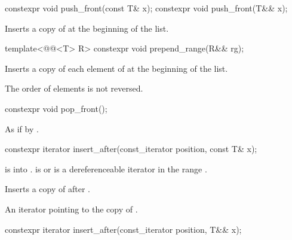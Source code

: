 %
\begin{itemdecl}
constexpr void push_front(const T& x);
constexpr void push_front(T&& x);
\end{itemdecl}

\begin{itemdescr}
\pnum
\effects
Inserts a copy of  at the beginning of the list.
\end{itemdescr}

%
\begin{itemdecl}
template<@@<T> R>
  constexpr void prepend_range(R&& rg);
\end{itemdecl}

\begin{itemdescr}
\pnum
\effects
Inserts a copy of each element of  at the beginning of the list.
\begin{note}
The order of elements is not reversed.
\end{note}
\end{itemdescr}

%
\begin{itemdecl}
constexpr void pop_front();
\end{itemdecl}

\begin{itemdescr}
\pnum
\effects
As if by .
\end{itemdescr}

%
\begin{itemdecl}
constexpr iterator insert_after(const_iterator position, const T& x);
\end{itemdecl}

\begin{itemdescr}
\pnum
\expects
{} is  into .
 is  or is a dereferenceable
iterator in the range .

\pnum
\effects
Inserts a copy of  after .

\pnum
\returns
An iterator pointing to the copy of .
\end{itemdescr}

%
\begin{itemdecl}
constexpr iterator insert_after(const_iterator position, T&& x);
\end{itemdecl}

